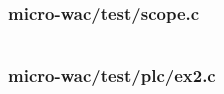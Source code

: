 \documentclass[a4paper]{article}
\begin{document}
\newpage
\subsubsection{micro-wac/test/scope.c}
\label{sec:appendix:code:test-scope.c}
\inputminted[breaklines,tabsize=2,linenos]{c}{../micro-wac/test/scope.c}

\newpage
\subsubsection{micro-wac/test/plc/ex2.c}
\label{sec:appendix:code:plc-ex2.c}
\inputminted[breaklines,tabsize=2,linenos]{c}{../micro-wac/test/plc/ex2.c}
\end{document}
